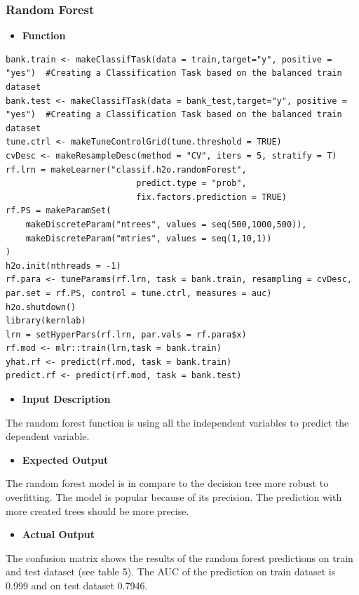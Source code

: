  \subsubsection{Random Forest}
 \begin{itemize}
		\item \textbf{Function}
	\end{itemize}
	
	\begin{lstlisting}
bank.train <- makeClassifTask(data = train,target="y", positive = "yes")  #Creating a Classification Task based on the balanced train dataset
bank.test <- makeClassifTask(data = bank_test,target="y", positive = "yes")  #Creating a Classification Task based on the balanced train dataset
tune.ctrl <- makeTuneControlGrid(tune.threshold = TRUE)
cvDesc <- makeResampleDesc(method = "CV", iters = 5, stratify = T)
rf.lrn = makeLearner("classif.h2o.randomForest",
                          predict.type = "prob",
                          fix.factors.prediction = TRUE)
rf.PS = makeParamSet(
    makeDiscreteParam("ntrees", values = seq(500,1000,500)),
    makeDiscreteParam("mtries", values = seq(1,10,1))
)
h2o.init(nthreads = -1)
rf.para <- tuneParams(rf.lrn, task = bank.train, resampling = cvDesc, par.set = rf.PS, control = tune.ctrl, measures = auc)
h2o.shutdown()
library(kernlab)
lrn = setHyperPars(rf.lrn, par.vals = rf.para$x)
rf.mod <- mlr::train(lrn,task = bank.train)
yhat.rf <- predict(rf.mod, task = bank.train)
predict.rf <- predict(rf.mod, task = bank.test)
	\end{lstlisting}
  	\begin{itemize}
  		\item \textbf{Input Description}
  	\end{itemize}
  	\noindent The random forest function is using all the independent variables to predict the dependent variable.
  	\begin{itemize}
  		\item \textbf{Expected Output}
  	\end{itemize}
  	The random forest model is in compare to the decision tree more robust to overfitting. The model is popular because of its precision. The prediction with more created trees should be more precise.\\   
  	\begin{itemize}
  		\item \textbf{Actual Output}
  	\end{itemize}
  	\noindent The confusion matrix shows the results of the random forest predictions on train and test dataset (see table 5). The AUC of the prediction on train dataset is 0.999 and on test dataset 0.7946.
